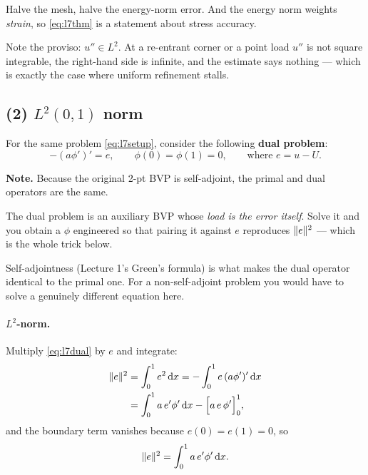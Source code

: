 \begin{mechanics}
Halve the mesh, halve the energy-norm error. And the energy norm weights
\emph{strain}, so \eqref{eq:l7thm} is a statement about stress accuracy.

Note the proviso: $u''\in L^{2}$. At a re-entrant corner or a point load $u''$
is not square integrable, the right-hand side is infinite, and the estimate
says nothing --- which is exactly the case where uniform refinement stalls.
\end{mechanics}

\subsection*{(2) $L^{2}(0,1)$ norm}

For the same problem \eqref{eq:l7setup}, consider the following
\textbf{dual problem}:
\begin{equation}\label{eq:l7dual}
  -(a\phi')'=e,\qquad \phi(0)=\phi(1)=0,
  \qquad\text{where } e=u-U .
\end{equation}

\medskip\noindent\textbf{Note.} Because the original 2-pt BVP is self-adjoint,
the primal and dual operators are the same.

\begin{intuition}
The dual problem is an auxiliary BVP whose \emph{load is the error itself}.
Solve it and you obtain a $\phi$ engineered so that pairing it against $e$
reproduces $\lVert e\rVert^{2}$ --- which is the whole trick below.

Self-adjointness (Lecture 1's Green's formula) is what makes the dual operator
identical to the primal one. For a non-self-adjoint problem you would have to
solve a genuinely different equation here.
\end{intuition}

\paragraph{$L^{2}$-norm.} Multiply \eqref{eq:l7dual} by $e$ and integrate:
\begin{align}
  \lVert e\rVert^{2}
   &= \int_0^1 e^{2}\,\mathrm{d} x
    = -\int_0^1 e\,(a\phi')'\,\mathrm{d} x \notag\\
   &= \int_0^1 a\,e'\phi'\,\mathrm{d} x - \Bigl[a\,e\,\phi'\Bigr]_0^1 ,
   \label{eq:l7ibp}
\end{align}
and the boundary term vanishes because $e(0)=e(1)=0$, so
\begin{equation}\label{eq:l7esq}
  \lVert e\rVert^{2}=\int_0^1 a\,e'\phi'\,\mathrm{d} x .
\end{equation}

